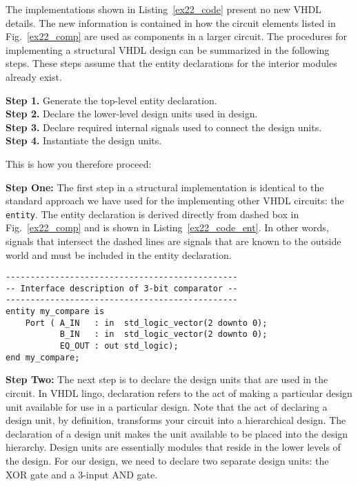 The implementations shown in Listing~\ref{ex22_code} present no new VHDL details. The new information is contained in how the circuit elements listed in Fig.~\ref{ex22_comp} are used as components in a larger circuit. The procedures for implementing a structural VHDL design can be summarized in the following steps. These steps assume that the entity declarations for the interior modules already exist.

\noindent
\textbf{Step 1.} Generate the top-level entity declaration.\\
\textbf{Step 2.} Declare the lower-level design units used in design.\\
\textbf{Step 3.} Declare required internal signals used to connect the design units.\\
\textbf{Step 4.} Instantiate the design units.

This is how you therefore proceed:

\noindent
\textbf{Step One:} The first step in a structural implementation is identical to the standard approach we have used for the implementing other VHDL circuits: the \texttt{entity}. The entity declaration is derived directly from dashed box in Fig.~\ref{ex22_comp} and is shown in Listing~\ref{ex22_code_ent}. In other words, signals that intersect the dashed lines are signals that are known to the outside world and must be included in the entity declaration.

\noindent
\begin{minipage}{0.99\linewidth}
\begin{lstlisting}[label=ex22_code_ent, caption=Entity declaration for 3-bit comparator.]
-----------------------------------------------
-- Interface description of 3-bit comparator --
-----------------------------------------------
entity my_compare is
    Port ( A_IN   : in  std_logic_vector(2 downto 0);
           B_IN   : in  std_logic_vector(2 downto 0);
           EQ_OUT : out std_logic);
end my_compare;
\end{lstlisting}
\end{minipage}

\noindent
\textbf{Step Two:} The next step is to declare the design units that are used in the circuit. In VHDL lingo, declaration refers to the act of making a particular design unit available for use in a particular design. Note that the act of declaring a design unit, by definition, transforms your circuit into a hierarchical design. The declaration of a design unit makes the unit available to be placed into the design hierarchy. Design units are essentially modules that reside in the lower levels of the design. For our design, we need to declare two separate design units: the XOR gate and a 3-input AND gate.  

